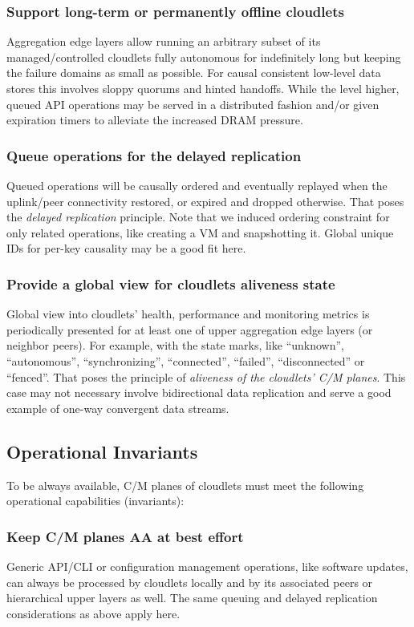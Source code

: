 \documentclass[conference]{IEEEtran}
\begin{document}
\subsubsection{Support long-term or permanently offline cloudlets}
Aggregation edge layers allow running an arbitrary subset of its
managed/controlled cloudlets fully autonomous for indefinitely long but keeping
the failure domains as small as possible. For causal consistent low-level data
stores this involves sloppy quorums and hinted handoffs\cite{b17}. While the
level higher, queued API operations may be served in a distributed fashion
and/or given expiration timers to alleviate the increased DRAM pressure.

\subsubsection{Queue operations for the delayed replication}
Queued operations will be causally ordered and eventually replayed when the
uplink/peer connectivity restored, or expired and dropped otherwise. That poses
the \textit{delayed replication} principle. Note that we induced ordering
constraint for only related operations, like creating a VM and snapshotting it.
Global unique IDs for per-key causality may be a good fit here.

\subsubsection{Provide a global view for cloudlets aliveness state}
Global view into cloudlets' health, performance and monitoring metrics is
periodically presented for at least one of upper aggregation edge layers (or
neighbor peers). For example, with the state marks, like ``unknown'',
``autonomous'', ``synchronizing'', ``connected'', ``failed'', ``disconnected''
or ``fenced''. That poses the principle of \textit{aliveness of the cloudlets'
C/M planes}. This case may not necessary involve bidirectional data
replication and serve a good example of one-way convergent data streams.

\subsection{Operational Invariants}
To be always available, C/M planes of cloudlets must meet the following
operational capabilities (invariants):

\subsubsection{Keep C/M planes AA at best effort}
Generic API/CLI or configuration management operations, like software updates,
can always be processed by cloudlets locally and by its associated peers or
hierarchical upper layers as well. The same queuing and delayed replication
considerations as above apply here.
\end{document}
